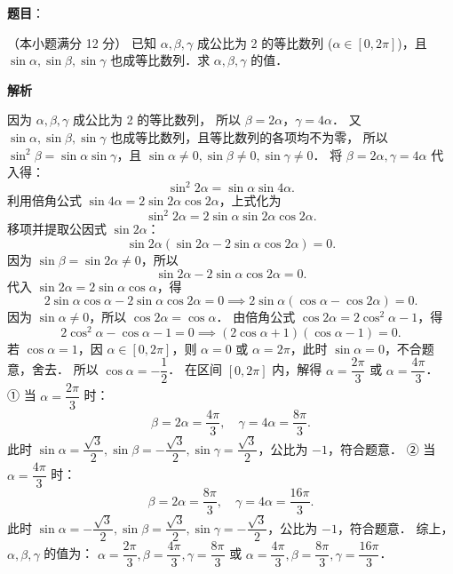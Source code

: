 \begin{answer}

\textbf{题目}：

（本小题满分 12 分）
已知 $\alpha, \beta, \gamma$ 成公比为 2 的等比数列 ($\alpha \in [0, 2\pi]$)，且 $\sin\alpha, \sin\beta, \sin\gamma$ 也成等比数列．求 $\alpha, \beta, \gamma$ 的值．

\textbf{解析}

因为 $\alpha, \beta, \gamma$ 成公比为 2 的等比数列，
所以 $\beta = 2\alpha$，$\gamma = 4\alpha$．
又 $\sin\alpha, \sin\beta, \sin\gamma$ 也成等比数列，且等比数列的各项均不为零，
所以 $\sin^2\beta = \sin\alpha \sin\gamma$，且 $\sin\alpha \neq 0, \sin\beta \neq 0, \sin\gamma \neq 0$．
将 $\beta = 2\alpha, \gamma = 4\alpha$ 代入得：
\nopagebreak[4]
\[
\sin^2 2\alpha = \sin\alpha \sin 4\alpha.
\]
利用倍角公式 $\sin 4\alpha = 2\sin 2\alpha \cos 2\alpha$，上式化为
\nopagebreak[4]
\[
\sin^2 2\alpha = 2\sin\alpha \sin 2\alpha \cos 2\alpha.
\]
移项并提取公因式 $\sin 2\alpha$：
\nopagebreak[4]
\[
\sin 2\alpha (\sin 2\alpha - 2\sin\alpha \cos 2\alpha) = 0.
\]
因为 $\sin\beta = \sin 2\alpha \neq 0$，所以
\nopagebreak[4]
\[
\sin 2\alpha - 2\sin\alpha \cos 2\alpha = 0.
\]
代入 $\sin 2\alpha = 2\sin\alpha \cos\alpha$，得
\nopagebreak[4]
\[
2\sin\alpha \cos\alpha - 2\sin\alpha \cos 2\alpha = 0 \implies 2\sin\alpha (\cos\alpha - \cos 2\alpha) = 0.
\]
因为 $\sin\alpha \neq 0$，所以 $\cos 2\alpha = \cos\alpha$．
由倍角公式 $\cos 2\alpha = 2\cos^2\alpha - 1$，得
\nopagebreak[4]
\[
2\cos^2\alpha - \cos\alpha - 1 = 0 \implies (2\cos\alpha + 1)(\cos\alpha - 1) = 0.
\]
若 $\cos\alpha = 1$，因 $\alpha \in [0, 2\pi]$，则 $\alpha = 0$ 或 $\alpha = 2\pi$，此时 $\sin\alpha = 0$，不合题意，舍去．
所以 $\cos\alpha = -\dfrac{1}{2}$．
在区间 $[0, 2\pi]$ 内，解得 $\alpha = \dfrac{2\pi}{3}$ 或 $\alpha = \dfrac{4\pi}{3}$．
① 当 $\alpha = \dfrac{2\pi}{3}$ 时：
\nopagebreak[4]
\[
\beta = 2\alpha = \dfrac{4\pi}{3}, \quad \gamma = 4\alpha = \dfrac{8\pi}{3}.
\]
此时 $\sin\alpha = \dfrac{\sqrt{3}}{2}, \sin\beta = -\dfrac{\sqrt{3}}{2}, \sin\gamma = \dfrac{\sqrt{3}}{2}$，公比为 $-1$，符合题意．
② 当 $\alpha = \dfrac{4\pi}{3}$ 时：
\nopagebreak[4]
\[
\beta = 2\alpha = \dfrac{8\pi}{3}, \quad \gamma = 4\alpha = \dfrac{16\pi}{3}.
\]
此时 $\sin\alpha = -\dfrac{\sqrt{3}}{2}, \sin\beta = \dfrac{\sqrt{3}}{2}, \sin\gamma = -\dfrac{\sqrt{3}}{2}$，公比为 $-1$，符合题意．
综上，$\alpha, \beta, \gamma$ 的值为：
$\alpha = \dfrac{2\pi}{3}, \beta = \dfrac{4\pi}{3}, \gamma = \dfrac{8\pi}{3}$ 或 $\alpha = \dfrac{4\pi}{3}, \beta = \dfrac{8\pi}{3}, \gamma = \dfrac{16\pi}{3}$．


\end{answer}
